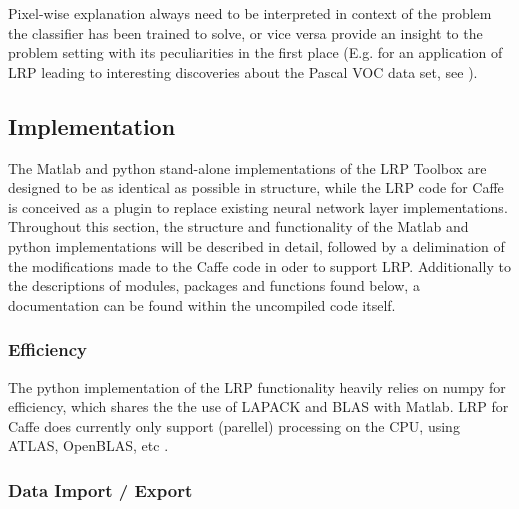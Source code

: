 \documentclass[a4wide]{article}
\begin{document}
Pixel-wise explanation always need to be interpreted in context of the problem the classifier has been trained to solve, or vice versa provide an insight to the problem setting with its peculiarities in the first place (E.g. for an application of LRP leading to interesting discoveries about the Pascal VOC \cite{everingham2010pascal} data set, see \cite{lapuschkin2016analyzing}).





\subsection*{Implementation}

The Matlab and python stand-alone implementations of the LRP Toolbox are designed to be as identical as possible in structure, while the LRP code for Caffe is conceived as a plugin to replace existing neural network layer implementations. Throughout this section, the structure and functionality of the Matlab and python implementations will be described in detail, followed by a delimination of the modifications made to the Caffe code in oder to support LRP. Additionally to the descriptions of modules, packages and functions found below, a documentation can be found within the uncompiled code itself.

\subsubsection*{Efficiency}

The python implementation of the LRP functionality heavily relies on numpy for efficiency, which shares the the use of LAPACK and BLAS with Matlab. LRP for Caffe does currently only support (parellel) processing on the CPU, using ATLAS, OpenBLAS, etc .

\subsubsection*{Data Import / Export}
\end{document}
